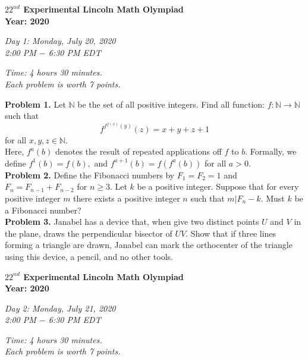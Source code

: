 \documentclass[12pt,a4paper]{article}
\begin{document}
\begin{center}
\textbf{\fontsize{16}{14}\selectfont
\(22^{nd}\) Experimental Lincoln Math Olympiad \\
Year: 2020}
\end{center}
\begin{flushright}
\textit{Day 1: Monday, July 20, 2020}\\
\textit{2:00 PM \(-\) 6:30 PM EDT}
\end{flushright}
\begin{center}
\textit{Time: 4 hours 30 minutes.\\
Each problem is worth 7 points.}
\end{center}
\textbf{Problem 1.} Let \(\mathbb{N}\) be the set of all positive integers. Find all function: \(f: \mathbb{N}  \to \mathbb{N} \) such that
\[{f^{{f^{f\left( x \right)}}\left( y \right)}}\left( z \right) = x + y + z + 1\]
for all \(x, y, z \in \mathbb{N}.\)\\
Here, \({f^a}\left( b \right)\) denotes the result of repeated applications off \(f\) to \(b.\) Formally, we define \({f^1}\left( b \right) = f\left( b \right),\) and \({f^{a + 1}}\left( b \right) = f\left( {{f^a}\left( b \right)} \right)\) for all \(a > 0.\)\\
\newline
\textbf{Problem 2.} Define the Fibonacci numbers by \(F_1 = F_2 = 1\) and \(F_n = F_{n-1} + F_{n-2}\) for \(n \ge 3.\) Let \(k\) be a positive integer. Suppose that for every positive integer \(m\) there exists a positive integer \(n\) such that \(m|{F_n} - k.\) Must \(k\) be a Fibonacci number?\\
\newline
\textbf{Problem 3.} Janabel has a device that, when give two distinct points \(U\) and \(V\) in the plane, draws the perpendicular bisector of \(UV.\) Show that if three lines forming a triangle are drawn, Janabel can mark the orthocenter of the triangle using this device, a pencil, and no other tools.
\newpage
\begin{center}
\textbf{\fontsize{16}{14}\selectfont
\(22^{nd}\) Experimental Lincoln Math Olympiad \\
Year: 2020}
\end{center}
\begin{flushright}
\textit{Day 2: Monday, July 21, 2020}\\
\textit{2:00 PM \(-\) 6:30 PM EDT}
\end{flushright}
\begin{center}
\textit{Time: 4 hours 30 minutes.\\
Each problem is worth 7 points.}
\end{center}
\end{document}
